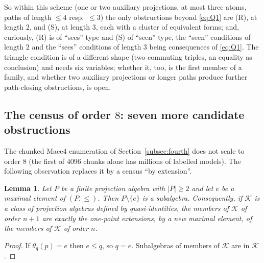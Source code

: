 \documentclass[11pt]{amsart}
\newtheorem{lemma}[theorem]{Lemma}
\theoremstyle{definition}
\begin{document}
So within this scheme (one or two auxiliary projections, at most three atoms, paths of length $\le4$ resp.\ $\le3$) the only obstructions beyond \eqref{eq:Q1} are (R), at length $2$, and (S), at length $3$, each with a cluster of equivalent forms; and, curiously, (R) is of ``sees'' type and (S) of ``seen'' type, the ``seen'' conditions of length $2$ and the ``sees'' conditions of length $3$ being consequences of \eqref{eq:Q1}. The triangle condition is of a different shape (two commuting triples, an equality as conclusion) and needs six variables; whether it, too, is the first member of a family, and whether two auxiliary projections or longer paths produce further path-closing obstructions, is open.


\subsection{The census of order $8$: seven more candidate obstructions}\label{subsec:census8}

The chunked Mace4 enumeration of Section~\ref{subsec:fourth} does not scale to order $8$ (the first of $4096$ chunks alone has millions of labelled models). The following observation replaces it by a census ``by extension''.

\begin{lemma}\label{lem:extension}
Let $P$ be a finite projection algebra with $|P|\ge2$ and let $e$ be a maximal element of $(P,\le)$. Then $P\setminus\{e\}$ is a subalgebra. Consequently, if $\mathcal K$ is a class of projection algebras defined by quasi-identities, the members of $\mathcal K$ of order $n+1$ are exactly the one-point extensions, by a new maximal element, of the members of $\mathcal K$ of order $n$.
\end{lemma}

\begin{proof}
If $\theta_q(p)=e$ then $e\le q$, so $q=e$. Subalgebras of members of $\mathcal K$ are in $\mathcal K$.
\end{proof}
\end{document}
